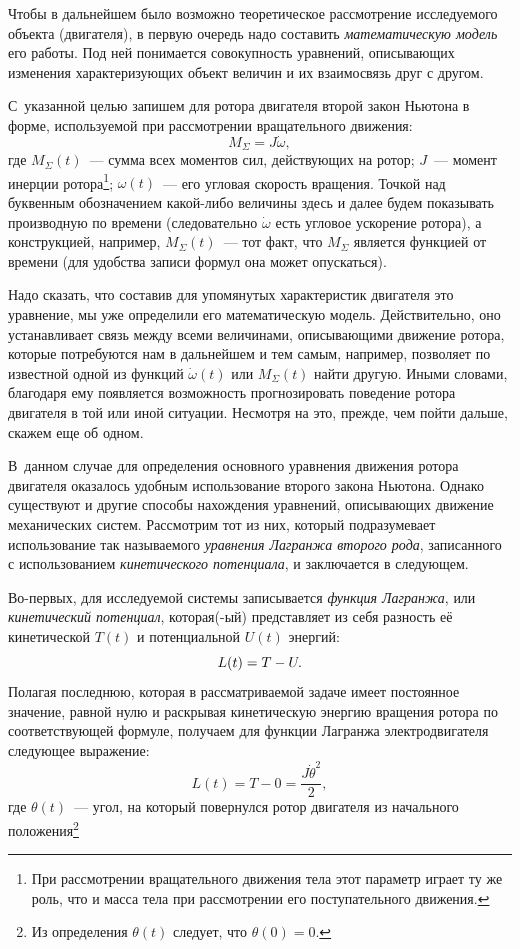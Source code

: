 \documentclass[12pt,a4paper,openany]{extarticle}
\begin{document}
Чтобы в дальнейшем было возможно теоретическое рассмотрение исследуемого объекта (двигателя), в первую очередь надо составить \textit{математическую модель} его работы.
Под ней понимается совокупность уравнений, описывающих изменения характеризующих объект величин и их взаимосвязь друг с другом.

С~указанной целью запишем для ротора двигателя второй закон Ньютона в форме, используемой при рассмотрении вращательного движения:
\begin{equation}\label{New's_eq}
	M_\varSigma = J\dot{\omega},
\end{equation}
где $M_\varSigma(t)$~--- сумма всех моментов сил, действующих на ротор; $J$~--- момент инерции ротора\footnote{При рассмотрении вращательного движения тела этот параметр играет ту же роль, что и масса тела при рассмотрении его поступательного движения.}; $\omega(t)$~--- его угловая скорость вращения.
Точкой над буквенным обозначением какой-либо величины здесь и далее будем показывать производную по времени (следовательно $\dot{\omega}$ есть угловое ускорение ротора), а конструкцией, например, $M_\varSigma(t)$~--- тот факт, что $M_\varSigma$ является функцией от времени (для удобства записи формул она может опускаться).

Надо сказать, что составив для упомянутых характеристик двигателя это уравнение, мы уже определили его математическую модель.
Действительно, оно устанавливает связь между всеми величинами, описывающими движение ротора, которые потребуются нам в дальнейшем и тем самым, например, позволяет по известной одной из функций $\dot\omega(t)$ или $M_\varSigma(t)$ найти другую.
Иными словами, благодаря ему появляется возможность прогнозировать поведение ротора двигателя в той или иной ситуации.
Несмотря на это, прежде, чем пойти дальше, скажем еще об одном.

В~данном случае для определения основного уравнения движения ротора двигателя оказалось удобным использование второго закона Ньютона. 
Однако существуют и другие способы нахождения уравнений, описывающих движение механических систем.
Рассмотрим тот из них, который подразумевает использование так называемого {\itshape уравнения Лагранжа второго рода}, записанного с использованием \textit{кинетического потенциала}, и заключается в следующем.

Во-первых, для исследуемой системы записывается {\itshape функция Лагранжа}, или \textit{кинетический потенциал}, которая(-ый) представляет из себя разность её кинетической $T(t)$ и потенциальной $U(t)$ энергий:
\begin{equation}\label{just_lagr}
	L(t) = T - U\ldotp
\end{equation}
Полагая последнюю, которая в рассматриваемой задаче имеет постоянное значение, равной нулю и раскрывая кинетическую энергию вращения ротора по соответствующей формуле, получаем для функции Лагранжа электродвигателя следующее выражение:
\begin{equation}\label{lagr_with_kinet}
	L(t) = T - 0 = \frac{J\dot{\theta}^2}{2}, 
\end{equation}
где $\theta(t)$~--- угол, на который повернулся ротор двигателя из начального положения\footnote{Из определения $\theta(t)$ следует, что $\theta(0) = 0$.}
\end{document}
